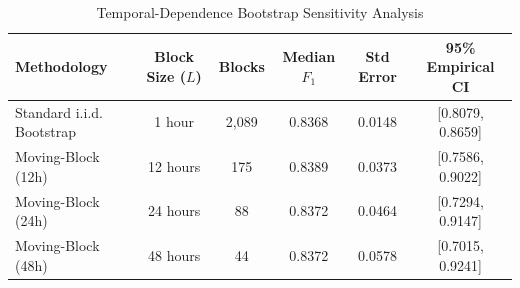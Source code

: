 \begin{table}[htbp]
\centering
\caption{Temporal-Dependence Bootstrap Sensitivity Analysis}
\label{tab:bootstrap_sensitivity}
\begin{tabular}{lccccc}
\toprule
Methodology & Block Size ($L$) & Blocks & Median $F_1$ & Std Error & 95\% Empirical CI \\
\midrule
Standard i.i.d. Bootstrap & 1 hour & 2,089 & 0.8368 & 0.0148 & [0.8079, 0.8659] \\
Moving-Block (12h) & 12 hours & 175 & 0.8389 & 0.0373 & [0.7586, 0.9022] \\
Moving-Block (24h) & 24 hours & 88 & 0.8372 & 0.0464 & [0.7294, 0.9147] \\
Moving-Block (48h) & 48 hours & 44 & 0.8372 & 0.0578 & [0.7015, 0.9241] \\
\bottomrule
\end{tabular}
\end{table}

